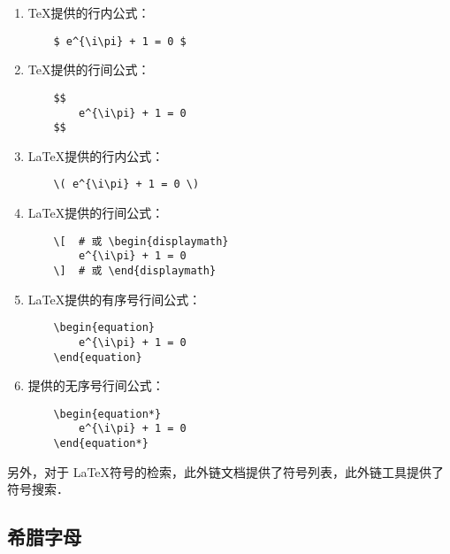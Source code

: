 \begin{enumerate}
	\item \TeX 提供的行内公式：
	\begin{verbatim}
	$ e^{\i\pi} + 1 = 0 $
	\end{verbatim}
	
	\item \TeX 提供的行间公式：
	\begin{verbatim}
	$$
	    e^{\i\pi} + 1 = 0
	$$
	\end{verbatim}
	
	\item \LaTeX 提供的行内公式：
	\begin{verbatim}
	\( e^{\i\pi} + 1 = 0 \)
	\end{verbatim}
	
	\item \LaTeX 提供的行间公式：
	\begin{verbatim}
	\[  # 或 \begin{displaymath}
	    e^{\i\pi} + 1 = 0
	\]  # 或 \end{displaymath}
	\end{verbatim}
	
	\item \LaTeX 提供的有序号行间公式：
	\begin{verbatim}
	\begin{equation}
	    e^{\i\pi} + 1 = 0
	\end{equation}
	\end{verbatim}
	
	\item \AmS 提供的无序号行间公式：
	\begin{verbatim}
	\begin{equation*}
	    e^{\i\pi} + 1 = 0
	\end{equation*}
	\end{verbatim}
\end{enumerate}

另外，对于 \LaTeX 符号的检索，此外链文档\cite{symbols}提供了符号列表，此外链工具\cite{Detexify}提供了符号搜索．

\newpage
\subsection{希腊字母}

